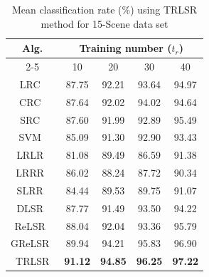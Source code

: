 \begin{table}
\caption{Mean classification rate ($\%$) using TRLSR method for 15-Scene data set}
\label{table: TRLSR_Accuracy_15}
\centering
\begin{tabular}{|c|cccc|}
\hline
\multirow{2}{*}{Alg.} & \multicolumn{4}{c|}{Training number ($t_r$)}                                                                                     \\ \cline{2-5} 
                      & \multicolumn{1}{c|}{10}             & \multicolumn{1}{c|}{20}             & \multicolumn{1}{c|}{30}             & 40             \\ \hline
LRC~\cite{LRC}                   & \multicolumn{1}{c|}{87.75}          & \multicolumn{1}{c|}{92.21}          & \multicolumn{1}{c|}{93.64}          & 94.97          \\ \hline
CRC~\cite{CRC}                   & \multicolumn{1}{c|}{87.64}          & \multicolumn{1}{c|}{92.02}          & \multicolumn{1}{c|}{94.02}          & 94.64          \\ \hline
SRC~\cite{SRC}                   & \multicolumn{1}{c|}{87.60}          & \multicolumn{1}{c|}{91.99}          & \multicolumn{1}{c|}{92.89}          & 95.49          \\ \hline
SVM~\cite{SVM}                   & \multicolumn{1}{c|}{85.09}          & \multicolumn{1}{c|}{91.30}          & \multicolumn{1}{c|}{92.90}          & 93.43          \\ \hline
LRLR~\cite{LRLR_SLRR}                  & \multicolumn{1}{c|}{81.08}          & \multicolumn{1}{c|}{89.49}          & \multicolumn{1}{c|}{86.59}          & 91.38          \\ \hline
LRRR~\cite{LRLR_SLRR}                  & \multicolumn{1}{c|}{86.02}          & \multicolumn{1}{c|}{88.24}          & \multicolumn{1}{c|}{87.72}          & 90.34          \\ \hline
SLRR~\cite{LRLR_SLRR}                  & \multicolumn{1}{c|}{84.44}          & \multicolumn{1}{c|}{89.53}          & \multicolumn{1}{c|}{89.75}          & 91.07          \\ \hline
DLSR~\cite{DLSR}                  & \multicolumn{1}{c|}{87.77}          & \multicolumn{1}{c|}{91.49}          & \multicolumn{1}{c|}{93.50}          & 94.22          \\ \hline
ReLSR~\cite{ReLSR}                 & \multicolumn{1}{c|}{88.04}          & \multicolumn{1}{c|}{92.04}          & \multicolumn{1}{c|}{93.36}          & 95.79          \\ \hline
GReLSR~\cite{GReLSR}                & \multicolumn{1}{c|}{89.94}          & \multicolumn{1}{c|}{94.21}          & \multicolumn{1}{c|}{95.83}          & 96.90          \\ \hline
TRLSR                 & \multicolumn{1}{c|}{\textbf{91.12}} & \multicolumn{1}{c|}{\textbf{94.85}} & \multicolumn{1}{c|}{\textbf{96.25}} & \textbf{97.22} \\ \hline
\end{tabular}
\end{table}

